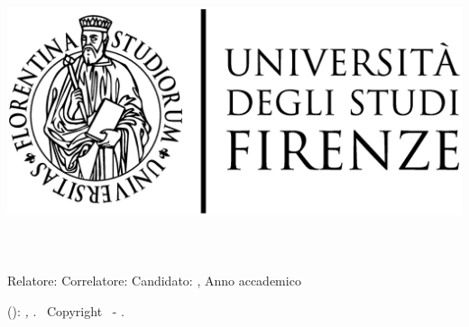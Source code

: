 \begin{titlepage}
	\begin{center}
   	\large
      \hfill
      \vfill
      \begingroup
			\spacedallcaps{\myUni} \\ 
			\myFaculty \\
			\myDegree \\ 
			\vspace{0.5cm}
         \includegraphics[width=.5\textwidth]{logo/logoUnifiName.eps}\\
         \vspace{0.5cm}    
      \endgroup 
      \vfill 
      \begingroup
      	\color{Maroon}\spacedallcaps{\myTitle} \\ \bigskip
      \endgroup
      \begingroup
      	\small\color{Maroon}\spacedallcaps{\mySubtitle} \\ \bigskip
      \endgroup
      \mySubsubtitle\\
      \vfill
      Relatore: {\itshape\myProf}\hfill Correlatore: {\itshape\mySupervisor}
      \vfill  
      Candidato: \spacedlowsmallcaps{\myName}
      \vfill
      {\itshape\myMonth \myYear}, Anno accademico {\itshape\myAcademicYear}
      \vfill                      
	\end{center}        
\end{titlepage}   
   \newpage
	\thispagestyle{empty}
	\hfill
	\vfill
	\noindent\myName(\texttt{\myMail}): 
	\textit{\myTitle,} 
	\myDegree. \textcopyright\ Copyright \myYear \myName\ - \mycopyright.

